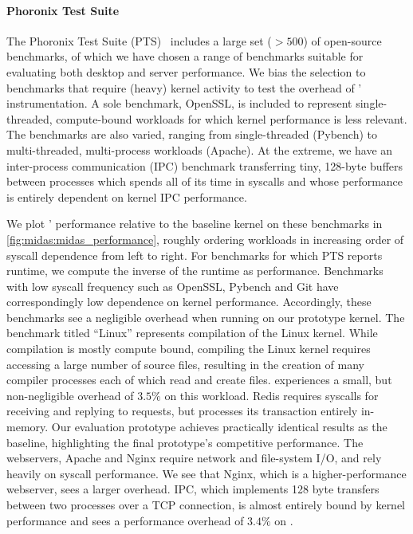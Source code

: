 \paragraph{Phoronix Test Suite}
The Phoronix Test Suite (PTS)~\cite{pts} includes a large set ($>500$) of
open-source benchmarks, of which we have chosen a range of benchmarks
suitable for evaluating both desktop and server performance.
We bias the selection to benchmarks that require (heavy) kernel activity to
test the overhead of \midas' instrumentation.
A sole benchmark, OpenSSL, is included to represent single-threaded,
compute-bound workloads for which kernel performance is less relevant.
The benchmarks are also varied, ranging from single-threaded (Pybench) to
multi-threaded, multi-process workloads (Apache).
At the extreme, we have an inter-process communication (IPC) benchmark 
transferring tiny, 128-byte
buffers between processes which spends all of its time in syscalls
and whose performance is entirely dependent on kernel IPC performance.

We plot \midas' performance relative to the baseline kernel on
these benchmarks in \autoref{fig:midas:midas_performance}, roughly ordering
workloads in increasing order of syscall dependence from left to right.
For benchmarks for which PTS reports runtime, we compute the inverse
of the runtime as performance.
Benchmarks with low syscall frequency such as OpenSSL,
Pybench and Git have correspondingly low dependence on kernel performance.
Accordingly, these benchmarks see a negligible overhead when running
on our prototype kernel.
The benchmark titled ``Linux'' represents compilation of the Linux kernel.
While compilation is mostly compute bound, compiling the Linux kernel requires
accessing a large number of source files, resulting in the creation
of many compiler processes each of which read and create files.
\midas experiences a small, but non-negligible overhead of $3.5\%$ on this workload.
Redis requires syscalls for receiving and replying to requests, but
processes its transaction entirely in-memory.
Our evaluation prototype achieves practically identical results as the baseline,
highlighting the final prototype's competitive performance.
The webservers, Apache and Nginx require network and file-system I/O,
and rely heavily on syscall performance.
We see that Nginx, which is a higher-performance webserver, sees a larger
overhead.
IPC, which implements 128 byte transfers between
two processes over a TCP connection, is almost entirely bound by kernel
performance and sees a performance overhead of $3.4\%$ on \midas.

